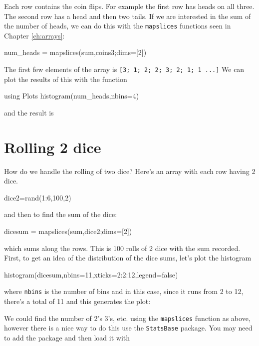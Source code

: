 Each row contains the coin flips.  For example the first row has heads on all three.  The second row has a head and then two tails.  If we are interested in the sum of the number of heads, we can do this with the \verb!mapslices! functions seen in Chapter \ref{ch:arrays}:
\begin{jlblock}[prob]
num_heads = mapslices(sum,coins3;dims=[2])
\end{jlblock}
The first few elements of the array is \verb![3; 1; 2; 2; 3; 2; 1; 1 ...]! We can plot the results of this with the function
%
\begin{jlblock}[prob]
using Plots
histogram(num_heads,nbins=4)
\end{jlblock}
and the result is
\begin{center}
\pgfplotsset{scale=0.8}
\end{center}


\section{Rolling 2 dice}

How do we handle the rolling of two dice? Here's an array with each row
having 2 dice.

\begin{jlblock}[prob]
dice2=rand(1:6,100,2)
\end{jlblock}
%
and then to find the sum of the dice:

\begin{jlblock}[prob]
dicesum = mapslices(sum,dice2;dims=[2])
\end{jlblock}
%
which sums along the rows. This is 100 rolls of 2 dice with the sum
recorded. First, to get an idea of the distribution of the dice sums,
let's plot the histogram
%
\begin{jlblock}[prob]
histogram(dicesum,nbins=11,xticks=2:2:12,legend=false)
\end{jlblock}
%
where \texttt{nbins} is the number of bins and in this case, since it
runs from 2 to 12, there's a total of 11 and this generates the plot: 
\begin{center}
\pgfplotsset{scale=0.7}
\end{center}

We could find the number of 2's 3's, etc. using the \texttt{mapslices}
function as above, however there is a nice way to do this use the
\texttt{StatsBase} package. You may need to add the package and then
load it with

